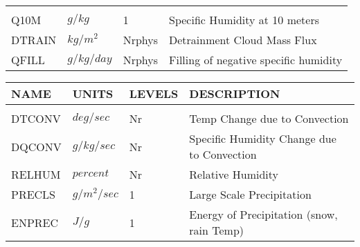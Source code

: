\begin{tabular}{llll}
\begin{minipage}[t]{3in}
         \end{minipage}\\
 Q10M    & $g/kg$ &    1
         &\begin{minipage}[t]{3in}
          {Specific Humidity at 10 meters}
         \end{minipage}\\
 DTRAIN  & $kg/m^2$ &    Nrphys
         &\begin{minipage}[t]{3in}
          {Detrainment Cloud Mass Flux}
         \end{minipage}\\
 QFILL   & $g/kg/day$ &    Nrphys
         &\begin{minipage}[t]{3in}
          {Filling of negative specific humidity}
         \end{minipage}\\
\end{tabular}
\vspace{1.5in}
\vfill

\newpage
\vspace*{\fill}
\begin{tabular}{llll}
\hline\hline
 NAME & UNITS & LEVELS & DESCRIPTION \\
\hline

&\\
 DTCONV   & $deg/sec$ & Nr
         &\begin{minipage}[t]{3in}
          {Temp Change due to Convection} 
         \end{minipage}\\
 DQCONV   & $g/kg/sec$ & Nr
         &\begin{minipage}[t]{3in}
          {Specific Humidity Change due to Convection} 
         \end{minipage}\\
 RELHUM   & $percent$ & Nr
         &\begin{minipage}[t]{3in}
          {Relative Humidity} 
         \end{minipage}\\
 PRECLS   & $g/m^2/sec$ & 1
         &\begin{minipage}[t]{3in}
          {Large Scale Precipitation} 
         \end{minipage}\\
 ENPREC   & $J/g$ & 1
         &\begin{minipage}[t]{3in}
          {Energy of Precipitation (snow, rain Temp)} 
         \end{minipage}\\
\end{tabular}
\vspace{1.5in}
\vfill

